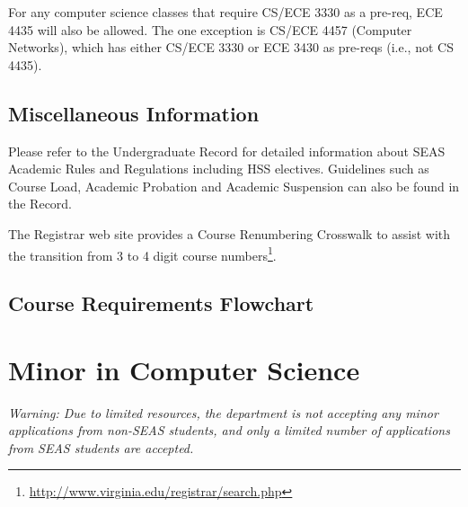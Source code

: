 \documentclass[10pt,letter]{book}
\newenvironment{itemlist}{
\begin{itemize}
\setlength{\itemsep}{0pt}
\setlength{\parskip}{0pt}}
{\end{itemize}}
\newcommand{\mychapter}[2]{\chapter{#1}\renewcommand{\leftmark}{\textsc{#2}}}
\newcommand{\mysection}[1]{\section{#1}\renewcommand{\rightmark}{#1}}
\newcommand{\myurl}[1]{\footnote{\scriptsize\url{#1}}}
\begin{document}
For any computer science classes that require CS/ECE 3330 as a
pre-req, ECE 4435 will also be allowed.  The one exception is CS/ECE
4457 (Computer Networks), which has either CS/ECE 3330 or ECE 3430 as
pre-reqs (i.e., not CS 4435).


\mysection{Miscellaneous Information}

Please refer to the Undergraduate Record for detailed information
about SEAS Academic Rules and Regulations including HSS
electives. Guidelines such as Course Load, Academic Probation and
Academic Suspension can also be found in the Record.

The Registrar web site provides a Course Renumbering Crosswalk to
assist with the transition from 3 to 4 digit course
numbers\myurl{http://www.virginia.edu/registrar/search.php}.



\clearpage
\mysection{Course Requirements Flowchart}

\begin{figure}[h!]
\end{figure}



\clearpage
\mychapter{Minor in Computer Science}{CS Minor}
\label{sec:csminor}

{\Large\em Warning: Due to limited resources, the department is not
accepting any minor applications from non-SEAS students, and only a
limited number of applications from SEAS students are accepted.}
\end{document}
